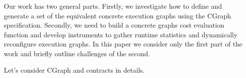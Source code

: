 Our work has two general parts.
Firstly, we investigate how to define and generate a set of the equivalent concrete execution graphs using the CGraph specification.
Secondly, we need to build a concrete graphs cost evaluation function and develop instruments to gather runtime statistics and dynamically reconfigure execution graphs.
In this paper we consider only the first part of the work and briefly outline challenges of the second.

Let's consider CGraph and contracts in details.
